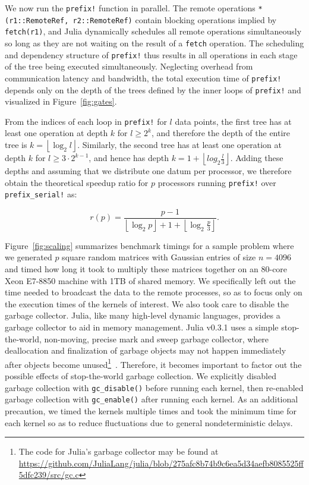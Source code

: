 \documentclass{sig-alternate}
\newcommand{\code}[1]{\texttt{#1}}
\newcommand{\floor}[1]{\left\lfloor #1 \right\rfloor}
\begin{document}
We now run the \code{prefix!} function in parallel. The remote operations
\code{*(r1::RemoteRef, r2::RemoteRef)} contain blocking operations implied by
\code{fetch(r1)}, and Julia dynamically schedules all remote operations
simultaneously so long as they are not waiting on the result of a \code{fetch}
operation. The scheduling and dependency structure of \code{prefix!} thus
results in all operations in each stage of the tree being executed
simultaneously. Neglecting overhead from communication latency and bandwidth,
the total execution time of \code{prefix!} depends only on the depth of the
trees defined by the inner loops of \code{prefix!} and visualized in
Figure~\ref{fig:gates}.

From the indices of each loop in \code{prefix!} for $l$ data points, the first
tree has at least one operation at depth $k$ for $l \ge 2^k$, and therefore the
depth of the entire tree is $k = \floor{\log_2 l}$. Similarly, the second tree
has at least one operation at depth $k$ for $l \ge 3\cdot2^{k-1}$, and hence
has depth $k = 1 + \floor{log_2 \frac l 3}$. Adding these depths and assuming
that we distribute one datum per processor, we therefore obtain the theoretical
speedup ratio for $p$ processors running \code{prefix!} over
\code{prefix\allowbreak\_serial!} as:

\begin{equation}
    r (p) = \frac {p-1} {\floor{\log_2 p} + 1 + \floor{\log_2 \frac p 3}}.
    \label{eq:scaling-theory}
\end{equation}

Figure~\ref{fig:scaling} summarizes benchmark timings for a sample problem
where we generated $p$ square random matrices with Gaussian entries of size $n
= 4096$ and timed how long it took to multiply these matrices together on an
80-core Xeon E7-8850 machine with 1TB of shared memory. We specifically left
out the time needed to broadcast the data to the remote processes, so as to
focus only on the execution times of the kernels of interest. We also took care
to disable the garbage collector. Julia, like many high-level dynamic
languages, provides a garbage collector to aid in memory management. Julia
v0.3.1 uses a simple stop-the-world, non-moving, precise mark and sweep garbage
collector, where deallocation and finalization of garbage objects may not
happen immediately after objects become unused\footnote{The
code for Julia's garbage collector may be found at
\url{https://github.com/JuliaLang/julia/blob/275afc8b74b9c6ea5d34aefb8085525ff5dfc239/src/gc.c}}~\cite{McCarthy1960}.
Therefore, it becomes important to factor out the possible effects of
stop-the-world garbage collection. We explicitly disabled garbage collection
with \code{gc\_disable()} before running each kernel, then re-enabled garbage
collection with \code{gc\_enable()} after running each kernel. As an additional
precaution, we timed the kernels multiple times and took the minimum time for
each kernel so as to reduce fluctuations due to general nondeterministic
delays.
\end{document}
